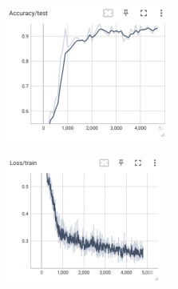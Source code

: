 \documentclass[12pt]{article}
\begin{document}
\begin{figure}[htbp]
	\centering
	\begin{minipage}{0.4\linewidth}
		\centering
		\includegraphics[width=0.9\linewidth]{./figures/2w2s_acc.png}
		\label{pic one}%
	\end{minipage}
	\begin{minipage}{0.4\linewidth}
		\centering
		\includegraphics[width=0.9\linewidth]{./figures/2w2s_train_loss.png}
		\label{pic two}%
	\end{minipage}
	\begin{minipage}{0.4\linewidth}
		\centering

\end{minipage}
\end{figure}
\end{document}

